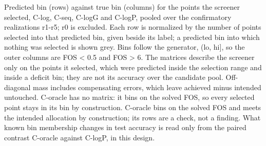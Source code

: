 Predicted bin (rows) against true bin (columns) for the points the screener selected, C-log, C-seq, C-logG and C-logP, pooled over the confirmatory realizations r1-r5; r0 is excluded. Each row is normalized by the number of points selected into that predicted bin, given beside its label; a predicted bin into which nothing was selected is shown grey. Bins follow the generator, (lo, hi], so the outer columns are FOS < 0.5 and FOS > 6. The matrices describe the screener only on the points it selected, which were predicted inside the selection range and inside a deficit bin; they are not its accuracy over the candidate pool. Off-diagonal mass includes compensating errors, which leave achieved minus intended untouched. C-oracle has no matrix: it bins on the solved FOS, so every selected point stays in its bin by construction. C-oracle bins on the solved FOS and meets the intended allocation by construction; its rows are a check, not a finding. What known bin membership changes in test accuracy is read only from the paired contrast C-oracle against C-logP, in this design.
